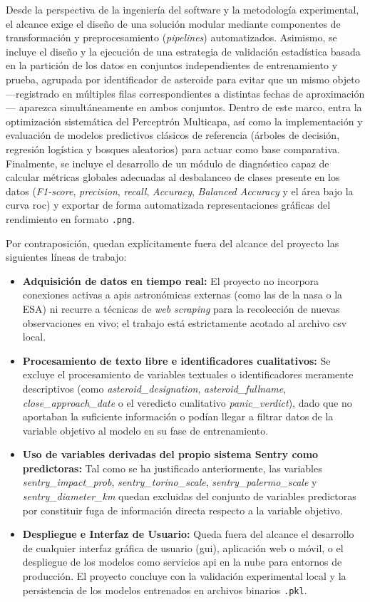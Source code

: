 \documentclass[12pt]{report} %
\begin{document}
Desde la perspectiva de la ingeniería del software y la metodología experimental, el alcance exige el diseño de una solución modular mediante componentes de transformación y preprocesamiento (\textit{pipelines}) automatizados. Asimismo, se incluye el diseño y la ejecución de una estrategia de validación estadística basada en la partición de los datos en conjuntos independientes de entrenamiento y prueba, agrupada por identificador de asteroide para evitar que un mismo objeto ---registrado en múltiples filas correspondientes a distintas fechas de aproximación--- aparezca simultáneamente en ambos conjuntos. Dentro de este marco, entra la optimización sistemática del Perceptrón Multicapa, así como la implementación y evaluación de modelos predictivos clásicos de referencia (árboles de decisión, regresión logística y bosques aleatorios) para actuar como base comparativa. Finalmente, se incluye el desarrollo de un módulo de diagnóstico capaz de calcular métricas globales adecuadas al desbalanceo de clases presente en los datos (\textit{F1-score}, \textit{precision}, \textit{recall}, \textit{Accuracy}, \textit{Balanced Accuracy} y el área bajo la curva \gls{roc}) y exportar de forma automatizada representaciones gráficas del rendimiento en formato \texttt{.png}.

Por contraposición, quedan explícitamente fuera del alcance del proyecto las siguientes líneas de trabajo:
\begin{itemize}
    \item \textbf{Adquisición de datos en tiempo real:} El proyecto no incorpora conexiones activas a \gls{api}s astronómicas externas (como las de la \gls{nasa} o la ESA) ni recurre a técnicas de \textit{web scraping} para la recolección de nuevas observaciones en vivo; el trabajo está estrictamente acotado al archivo \gls{csv} local.
    \item \textbf{Procesamiento de texto libre e identificadores cualitativos:} Se excluye el procesamiento de variables textuales o identificadores meramente descriptivos (como \textit{asteroid\_designation}, \textit{asteroid\_fullname}, \textit{close\_approach\_date} o el veredicto cualitativo \textit{panic\_verdict}), dado que no aportaban la suficiente información o podían llegar a filtrar datos de la variable objetivo al modelo en su fase de entrenamiento.
    \item \textbf{Uso de variables derivadas del propio sistema Sentry como predictoras:} Tal como se ha justificado anteriormente, las variables \textit{sentry\_impact\_prob}, \textit{sentry\_torino\_scale}, \textit{sentry\_palermo\_scale} y \textit{sentry\_diameter\_km} quedan excluidas del conjunto de variables predictoras por constituir fuga de información directa respecto a la variable objetivo.
    \item \textbf{Despliegue e Interfaz de Usuario:} Queda fuera del alcance el desarrollo de cualquier interfaz gráfica de usuario (\gls{gui}), aplicación web o móvil, o el despliegue de los modelos como servicios \gls{api} en la nube para entornos de producción. El proyecto concluye con la validación experimental local y la persistencia de los modelos entrenados en archivos binarios \texttt{.pkl}.
\end{itemize}
\end{document}
